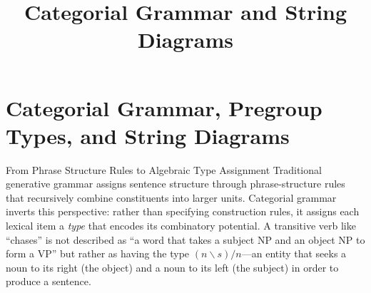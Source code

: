 \documentclass[
  ignorenonframetext,
]{beamer}
\title{\texorpdfstring{Categorial Grammar and String
Diagrams}{Categorial Grammar and String Diagrams}}
\author{\texorpdfstring{}{}}
\date{}
\begin{document}
\frame{\titlepage}

\section{Categorial Grammar, Pregroup Types, and String
Diagrams}\label{sec:categorial-grammar}

\begin{frame}{From Phrase Structure Rules to Algebraic Type Assignment}
\protect{}\label{from-phrase-structure-rules-to-algebraic-type-assignment}
Traditional generative grammar assigns sentence structure through
phrase-structure rules that recursively combine constituents into larger
units. Categorial grammar inverts this perspective: rather than
specifying construction rules, it assigns each lexical item a
\emph{type} that encodes its combinatory potential. A transitive verb
like ``chases'' is not described as ``a word that takes a subject NP and
an object NP to form a VP'' but rather as having the type
\((n \backslash s) / n\)---an entity that seeks a noun to its right (the
object) and a noun to its left (the subject) in order to produce a
sentence.
\end{frame}
\end{document}
